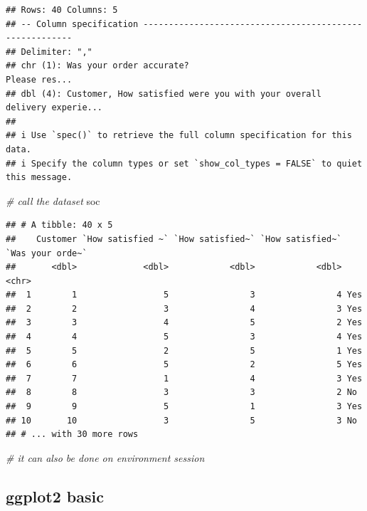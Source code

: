 \documentclass[
]{article}
\newenvironment{Shaded}{\begin{snugshade}}{\end{snugshade}}
\newcommand{\CommentTok}[1]{\textcolor[rgb]{0.56,0.35,0.01}{\textit{#1}}}
\newcommand{\NormalTok}[1]{#1}
\begin{document}
\begin{verbatim}
## Rows: 40 Columns: 5
## -- Column specification --------------------------------------------------------
## Delimiter: ","
## chr (1): Was your order accurate?                                 Please res...
## dbl (4): Customer, How satisfied were you with your overall delivery experie...
## 
## i Use `spec()` to retrieve the full column specification for this data.
## i Specify the column types or set `show_col_types = FALSE` to quiet this message.
\end{verbatim}

\begin{Shaded}
\begin{Highlighting}[]
\CommentTok{\# call the dataset}
\NormalTok{soc}
\end{Highlighting}
\end{Shaded}

\begin{verbatim}
## # A tibble: 40 x 5
##    Customer `How satisfied ~` `How satisfied~` `How satisfied~` `Was your orde~`
##       <dbl>             <dbl>            <dbl>            <dbl> <chr>           
##  1        1                 5                3                4 Yes             
##  2        2                 3                4                3 Yes             
##  3        3                 4                5                2 Yes             
##  4        4                 5                3                4 Yes             
##  5        5                 2                5                1 Yes             
##  6        6                 5                2                5 Yes             
##  7        7                 1                4                3 Yes             
##  8        8                 3                3                2 No              
##  9        9                 5                1                3 Yes             
## 10       10                 3                5                3 No              
## # ... with 30 more rows
\end{verbatim}

\begin{Shaded}
\begin{Highlighting}[]
\CommentTok{\# it can also be done on environment session}
\end{Highlighting}
\end{Shaded}

\hypertarget{ggplot2-basic}{%
\subsection{ggplot2 basic}\label{ggplot2-basic}}
\end{document}
